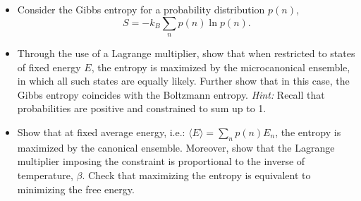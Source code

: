 \begin{Problem}
\begin{itemize}
    \item Consider the Gibbs entropy for a probability distribution \( p(n) \),
    \[
    S = -k_B \sum_n p(n) \ln p(n).
    \]
    
    \item Through the use of a Lagrange multiplier, show that when restricted to states of fixed energy \( E \), the entropy is maximized by the microcanonical ensemble, in which all such states are equally likely. Further show that in this case, the Gibbs entropy coincides with the Boltzmann entropy. \textit{Hint:} Recall that probabilities are positive and constrained to sum up to 1.
    
    \item Show that at fixed average energy, i.e.: \( \langle E \rangle = \sum_n p(n) E_n \), the entropy is maximized by the canonical ensemble. Moreover, show that the Lagrange multiplier imposing the constraint is proportional to the inverse of temperature, \( \beta \). Check that maximizing the entropy is equivalent to minimizing the free energy.
\end{itemize}
\end{Problem}
